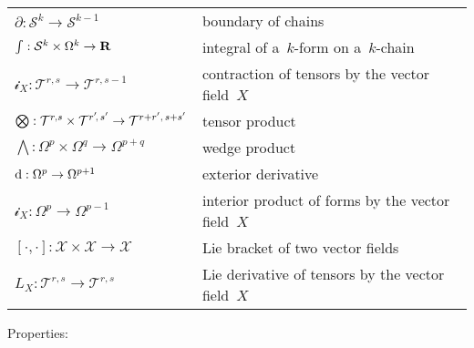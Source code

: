 \begin{tabular}{l|l}
	\hline
	$\partial:\mathcal{S}^k\to\mathcal{S}^{k-1}$ & boundary of chains \\
	$\int:\mathcal{S}^k\times\Omega^k\to\mathbf{R}$ & integral of a~$k$-form on
	a~$k$-chain \\
	$\mathcal{i}_X:\mathcal{T}^{r,s}\to\mathcal{T}^{r,s-1}$ & contraction of
	tensors by the vector field~$X$\\
	$\bigotimes:\mathcal{T}^{r,s}\times\mathcal{T}^{r'\!,\,s'}\to
	\mathcal{T}^{r+r'\/,\,s+s'}$ & tensor product \\
	$\bigwedge:\Omega^p\times\Omega^q\to\Omega^{p+q}$ & wedge product \\
	$\mathrm{d}:\Omega^p\to\Omega^{p+1}$ & exterior derivative \\
	$\mathcal{i}_X:\Omega^p\to\Omega^{p-1}$ & interior product of forms by the
	vector field~$X$ \\
	$[\cdot,\cdot]:\mathcal{X}\times\mathcal{X}\to\mathcal{X}$ & Lie bracket of
	two vector fields \\
	$L_X:\mathcal{T}^{r,s}\to\mathcal{T}^{r,s}$ & Lie derivative of tensors by
	the vector field~$X$ \\
\end{tabular}


\clearpage

Properties:

